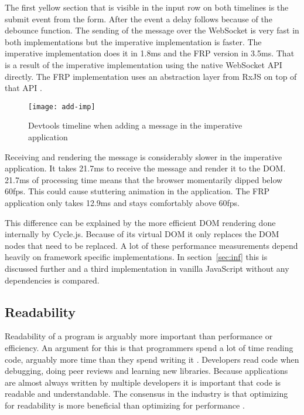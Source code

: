 The first yellow section that is visible in the input row on both timelines is the submit event from the form. After the event a delay follows because of the debounce function. The sending of the message over the WebSocket is very fast in both implementations but the imperative implementation is faster. The imperative implementation does it in 1.8ms and the FRP version in 3.5ms. That is a result of the imperative implementation using the native WebSocket API directly. The FRP implementation uses an abstraction layer from RxJS on top of that API \cite{ws-subject}.

\begin{figure}[H]
	\centering
	\texttt{[image: add-imp]}
	\caption{Devtools timeline when adding a message in the imperative application}
	\label{figure:add-imp}
\end{figure}

Receiving and rendering the message is considerably slower in the imperative application. It takes 21.7ms to receive the message and render it to the DOM. 21.7ms of processing time means that the browser momentarily dipped below 60fps. This could cause stuttering animation in the application. The FRP application only takes 12.9ms and stays comfortably above 60fps.

This difference can be explained by the more efficient DOM rendering done internally by Cycle.js. Because of its virtual DOM it only replaces the DOM nodes that need to be replaced. A lot of these performance measurements depend heavily on framework specific implementations. In section~\ref{sec:inf} this is discussed further and a third implementation in vanilla JavaScript without any dependencies is compared.

\subsection{Readability}

Readability of a program is arguably more important than performance or efficiency. An argument for this is that programmers spend a lot of time reading code, arguably more time than they spend writing it \cite{read}. Developers read code when debugging, doing peer reviews and learning new libraries. Because applications are almost always written by multiple developers it is important that code is readable and understandable. The consensus in the industry is that optimizing for readability is more beneficial than optimizing for performance \cite{read}.

